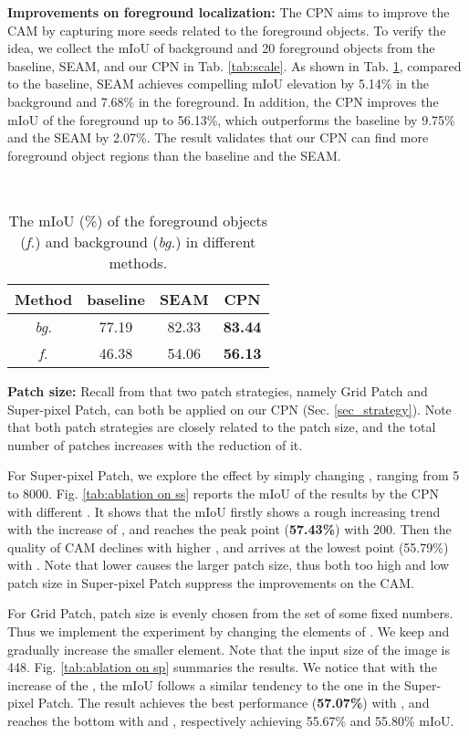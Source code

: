 \documentclass[10pt,twocolumn,letterpaper]{article}
\begin{document}
\noindent\textbf{Improvements on foreground localization:}\; The CPN aims to improve the CAM by capturing more seeds related to the foreground objects. To verify the idea, we collect the mIoU of background and 20 foreground objects from the baseline, SEAM, and our CPN in Tab. \ref{tab:scale}. As shown in Tab. \ref{tab:ablation on fb}, compared to the baseline, SEAM achieves compelling mIoU elevation by 5.14\% in the background and 7.68\% in the foreground. In addition, the CPN improves the mIoU of the foreground up to 56.13\%, which outperforms the baseline by 9.75\% and the SEAM by 2.07\%. The result validates that our CPN can find more foreground object regions than the baseline and the SEAM.
\begin{table}[!htbp]\small
\centering\
\begin{tabular}{c|c|c|c}
\hline
Method & baseline & SEAM & CPN \\
\hline
 \textit{bg.} & 77.19 & 82.33 & \textbf{83.44} \\
 \textit{f.} & 46.38 & 54.06 & \textbf{56.13} \\
\hline
\end{tabular}
\caption{The mIoU (\%) of the foreground objects (\textit{f.}) and background (\textit{bg.}) in different methods. }
\label{tab:ablation on fb}
\vspace{-2mm}
\end{table}

\noindent\textbf{Patch size:}\; Recall from that two patch strategies, namely Grid Patch and Super-pixel Patch, can both be applied on our CPN (Sec. \ref{sec_strategy}). Note that both patch strategies are closely related to the patch size, and the total number of patches increases with the reduction of it.

For Super-pixel Patch, we explore the effect by simply changing , ranging from 5 to 8000. Fig. \ref{tab:ablation on ss} reports the mIoU of the results by the CPN with different . It shows that the mIoU firstly shows a rough increasing trend with the increase of , and reaches the peak point (\textbf{57.43\%}) with  200. Then the quality of CAM declines with higher , and arrives at the lowest point (55.79\%) with . Note that lower  causes the larger patch size, thus both too high and low patch size in Super-pixel Patch suppress the improvements on the CAM.

For Grid Patch, patch size  is evenly chosen from the set  of some fixed numbers. Thus we implement the experiment by changing the elements of . We keep  and gradually increase the smaller element. Note that the input size of the image is 448. Fig. \ref{tab:ablation on sp} summaries the results. We notice that with the increase of the , the mIoU follows a similar tendency to the one in the Super-pixel Patch. The result achieves the best performance (\textbf{57.07\%}) with , and reaches the bottom with  and , respectively achieving 55.67\% and 55.80\% mIoU.
\end{document}
